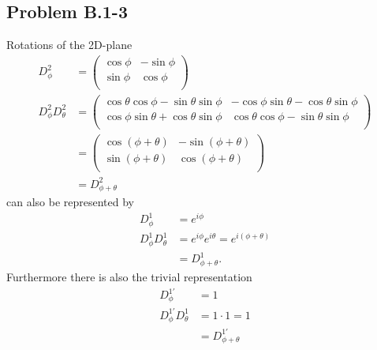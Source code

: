 \documentclass[../main.tex]{subfiles}
\begin{document}
\subsection{Problem B.1-3}
Rotations of the 2D-plane
\begin{align}
D^2_\phi&=\left(
\begin{array}{cc}
\cos\phi& -\sin\phi  \\
\sin\phi & \cos\phi  \\
\end{array}
\right)\\
D^2_\phi D^2_\theta&= \left(
\begin{array}{cc}
 \cos\theta \cos\phi-\sin\theta \sin\phi  & -\cos\phi \sin\theta-\cos\theta\sin\phi \\
 \cos\phi\sin\theta+\cos\theta \sin\phi & \cos\theta \cos\phi
   -\sin\theta \sin\phi \\
\end{array}
\right)\\
&=\left(
\begin{array}{cc}
\cos(\phi+\theta)& -\sin(\phi+\theta)  \\
\sin(\phi+\theta) & \cos(\phi+\theta)  \\
\end{array}
\right)\\
&=D^2_{\phi+\theta}
\end{align}
can also be represented by
\begin{align}
D^1_\phi&=e^{i\phi}\\
D^1_\phi D^1_\theta&=e^{i\phi}e^{i\theta}=e^{i(\phi+\theta)}\\
&=D^1_{\phi+\theta}.
\end{align}
Furthermore there is also the trivial representation
\begin{align}
D^{1'}_\phi&=1\\
D^{1'}_\phi D^1_\theta&=1\cdot1=1\\
&=D^{1'}_{\phi+\theta}
\end{align}
\end{document}
